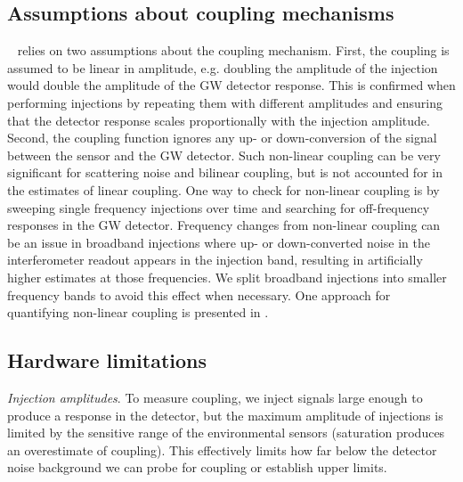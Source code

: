 \subsection{Assumptions about coupling mechanisms}

~ relies on two assumptions about the coupling mechanism.
First, the coupling is assumed to be linear in amplitude, e.g. doubling the amplitude of the injection would double the amplitude of the \ac{GW} detector response.
This is confirmed when performing injections by repeating them with different amplitudes and ensuring that the detector response scales proportionally with the injection amplitude.
Second, the coupling function ignores any up- or down-conversion of the signal between the sensor and the \ac{GW} detector.
Such non-linear coupling can be very significant for scattering noise and bilinear coupling, but is not accounted for in the estimates of linear coupling.
One way to check for non-linear coupling is by sweeping single frequency injections over time and searching for off-frequency responses in the \ac{GW} detector.
Frequency changes from non-linear coupling can be an issue in broadband injections where up- or down-converted noise in the interferometer readout appears in the injection band, resulting in artificially higher estimates at those frequencies.
We split broadband injections into smaller frequency bands to avoid this effect when necessary.
One approach for quantifying non-linear coupling is presented in \citet{Washimi_2020}.

\subsection{Hardware limitations}\label{sec:hardware-limitations}

\textit{Injection amplitudes}. To measure coupling, we inject signals large enough to produce a response in the detector, but the maximum amplitude of injections is limited by the sensitive range of the environmental sensors (saturation produces an overestimate of coupling).
This effectively limits how far below the detector noise background we can probe for coupling or establish upper limits.

